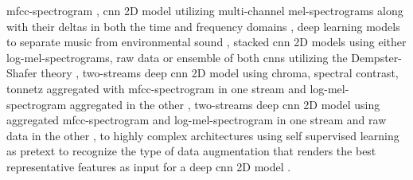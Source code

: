 \gls{mfcc}-spectrogram \cite{Shreyas2020}, \gls{cnn} 2D model utilizing multi-channel mel-spectrograms along with their deltas in both the time and frequency domains \cite{Tang2018}, deep learning models to separate music from environmental sound \cite{Rothmund2018}, stacked \gls{cnn} 2D models using either log-mel-spectrograms, raw data or ensemble of both \gls{cnn}s utilizing the Dempster-Shafer theory \cite{Li2018}, two-streams deep \gls{cnn} 2D model using chroma, spectral contrast, tonnetz aggregated with \gls{mfcc}-spectrogram in one stream and log-mel-spectrogram aggregated in the other \cite{Su2019}, two-streams deep \gls{cnn} 2D model using aggregated \gls{mfcc}-spectrogram and log-mel-spectrogram in one stream and raw data in the other \cite{Tran2020}, to highly complex architectures using self supervised learning as pretext to recognize the type of data augmentation that renders the best representative features as input for a deep \gls{cnn} 2D model \cite{Tripathi2021}.

